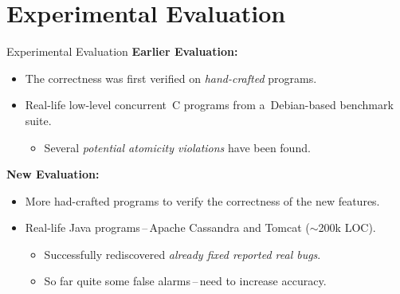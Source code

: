 \documentclass[10pt, hyperref={unicode}, aspectratio=169]{beamer}
\begin{document}
\section{Experimental Evaluation}
\begin{frame}{Experimental Evaluation}
    \textbf{Earlier Evaluation:}
    \medskip
    \begin{itemize}\setlength\itemsep{1em}
        \item 
            The \alert{correctness} was first verified on
            \emph{hand-crafted} programs.
            
        \item
            \alert{Real-life low-level concurrent~C} programs from 
            a~Debian-based benchmark suite.
            
            \smallskip
            
            \begin{itemize}\setlength\itemsep{1em}
                \item
                    Several \emph{potential atomicity violations} have
                    been found.
            \end{itemize}
    \end{itemize}

    \bigskip

    \textbf{New Evaluation:}
    \medskip
    \begin{itemize}\setlength\itemsep{1em}
        \item 
            More had-crafted programs to verify the correctness of
            the new features.
            
        \item
            \alert{Real-life Java} programs\,--\,\alert{Apache Cassandra}
            and \alert{Tomcat} ($ \sim $200k LOC).

            \smallskip

            \begin{itemize}\setlength\itemsep{1em}
                \item
                    Successfully rediscovered \emph{already fixed
                    reported real bugs}.

                \item
                    So far quite some \alert{false alarms}\,--\,need
                    to increase accuracy.
            \end{itemize}
    \end{itemize}
\end{frame}
\end{document}
